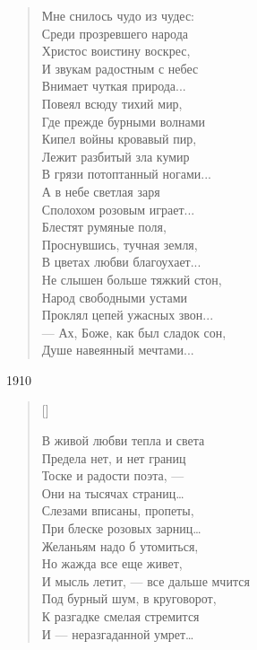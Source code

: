 \begin{verse}
\begin{patverse}
Мне снилось чудо из чудес:\\
Среди прозревшего народа\\
Христос воистину воскрес,\\
И звукам радостным с небес\\
Внимает чуткая природа...\\
Повеял всюду тихий мир,\\
Где прежде бурными волнами\\
Кипел войны кровавый пир,\\
Лежит разбитый зла кумир\\
В грязи потоптанный ногами...\\
А в небе светлая заря\\
Сполохом розовым играет...\\
Блестят румяные поля,\\
Проснувшись, тучная земля,\\
В цветах любви благоухает...\\
Не слышен больше тяжкий стон,\\
Народ свободными устами\\
Проклял цепей ужасных звон...\\
--- Ах, Боже, как был сладок сон,\\
Душе навеянный мечтами...
\end{patverse}
\end{verse}
1910




\settowidth{\versewidth}{В живой любви тепла и света}
\begin{verse}[\versewidth]
\begin{altverse}
В живой любви тепла и света\\
Предела нет, и нет границ\\
Тоске и радости поэта, --- \\
Они на тысячах страниц\ldots\\
Слезами вписаны, пропеты, \\
При блеске розовых зарниц\ldots\\
Желаньям надо б утомиться,\\
Но жажда все еще живет,\\
И мысль летит, --- все дальше мчится\\
Под бурный шум, в круговорот,\\
К разгадке смелая стремится\\
И --- неразгаданной умрет\ldots
\end{altverse}
\end{verse}


